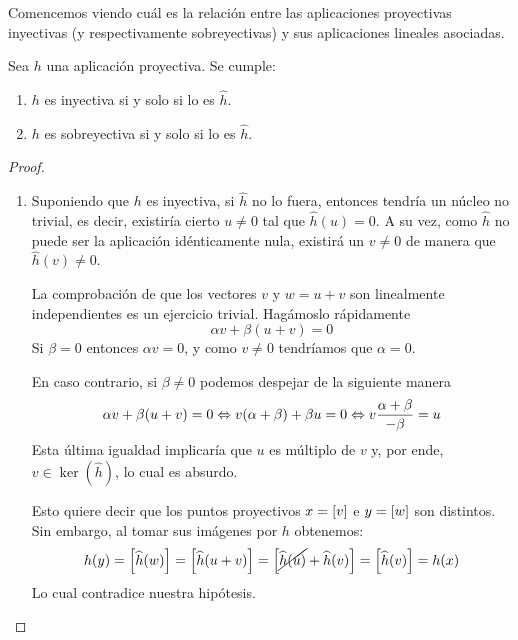 Comencemos viendo cuál es la relación entre las aplicaciones proyectivas inyectivas (y respectivamente sobreyectivas) y sus aplicaciones lineales asociadas.
\begin{lem}
	\label{C4_lem_inyectividadSobreyectividad}
	Sea $h$ una aplicación proyectiva. Se cumple:
	\begin{enumerate}
		\item $h$ es inyectiva si y solo si lo es $\widehat{h}$.
		\item $h$ es sobreyectiva si y solo si lo es $\widehat{h}$.
	\end{enumerate}
\end{lem}
\begin{proof}
	\begin{enumerate}
		\item Suponiendo que $h$ es inyectiva, si $\widehat{h}$ no lo fuera, entonces tendría un núcleo no trivial, es decir, existiría cierto $u\not=0$ tal que $\widehat{h}(u)=0$. A su vez, como $\widehat{h}$ no puede ser la aplicación idénticamente nula, existirá un $v\not=0$ de manera que $\widehat{h}(v)\not=0$.
		
		La comprobación de que los vectores $v$ y $w=u+v$ son linealmente independientes es un ejercicio trivial. Hagámoslo rápidamente
		\[
		\alpha v + \beta(u+v)=0
		\]
		Si $\beta = 0$ entonces $\alpha v = 0$, y como $v\not=0$ tendríamos que $\alpha=0$.
		
		En caso contrario, si $\beta\not=0$ podemos despejar de la siguiente manera
		\begin{equation*}\alpha v +\beta(u+v)=0\Leftrightarrow v(\alpha+\beta)+\beta u=0\Leftrightarrow v\frac{\alpha+\beta}{-\beta}=u\end{equation*}
		Esta última igualdad implicaría que $u$ es múltiplo de $v$ y, por ende, $v\in\ker(\widehat{h})$, lo cual es absurdo.
		
		Esto quiere decir que los puntos proyectivos $x=\left [ v \right ]$ e $y=\left [ w \right ]$ son distintos. Sin embargo, al tomar sus imágenes por $h$ obtenemos:
		\[h(y)=\left [ \widehat{h}(w) \right ]=\left [ \widehat{h}(u+v) \right ]=\left [ \cancel{\widehat{h}(u)}+\widehat{h}(v) \right ]=\left [ \widehat{h}(v) \right ]=h(x)\]
		Lo cual contradice nuestra hipótesis.
		

\end{enumerate}
\end{proof}
